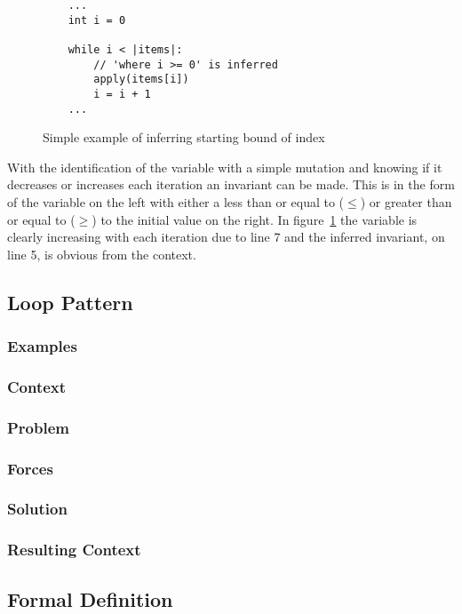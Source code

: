 \begin{figure}[ht]
\begin{lstlisting}
    ...
    int i = 0

    while i < |items|:
        // 'where i >= 0' is inferred
        apply(items[i])
        i = i + 1
    ...
\end{lstlisting}
\caption{Simple example of inferring starting bound of index}
\label{lst:whiley-start}
\end{figure}

With the identification of the variable with a simple mutation and knowing
if it decreases or increases each iteration an invariant can be made.
This is in the form of the variable on the left with either a less than or
equal to ($\leq$) or greater than or equal to ($\geq$) to the initial value on the
right.
In figure~\ref{lst:whiley-start} the variable  is clearly increasing
with each iteration due to line 7 and the inferred invariant, on line 5, is
obvious from the context.

\subsection{Loop Pattern}

\subsubsection{Examples}
\subsubsection{Context}
\subsubsection{Problem}
\subsubsection{Forces}
\subsubsection{Solution}
\subsubsection{Resulting Context}

\subsection{Formal Definition}

